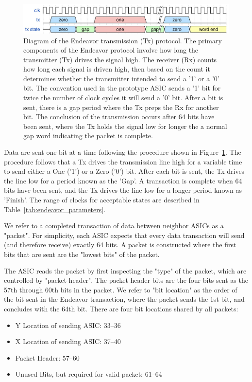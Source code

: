 \begin{figure}[]
\centering
\includegraphics[width=\textwidth]{images/endeavor_protocol.jpg}
\caption{Diagram of the Endeavor transmission (Tx) protocol.
The primary components of the Endeavor protocol involve how long the transmitter (Tx) drives the signal high.
The receiver (Rx) counts how long each signal is driven high, then based on the count it determines whether the transmitter intended to send a '1' or a '0' bit.
The convention used in the prototype ASIC sends a '1' bit for twice the number of clock cycles it will send a '0' bit.
After a bit is sent, there is a gap period where the Tx preps the Rx for another bit.
The conclusion of the transmission occurs after 64 bits have been sent, where the Tx holds the signal low for longer the a normal gap word indicating the packet is complete.
}
\label{fig:endeavor}
\end{figure}

Data are sent one bit at a time following the procedure shown in Figure~\ref{fig:endeavor}. 
The procedure follows that a Tx drives the transmission line high for a variable time to send either a One ('1') or a Zero ('0') bit.
After each bit is sent, the Tx drives the line low for a period known as the 'Gap'.
A transaction is complete when 64 bits have been sent, and the Tx drives the line low for a longer period known as 'Finish'.
The range of clocks for acceptable states are described in Table~\ref{tab:endeavor_parameters}.

We refer to a completed transaction of data between neighbor ASICs as a "packet".
For simplicity, each ASIC expects that every data transaction will send (and therefore receive) exactly 64 bits.
A packet is constructed where the first bits that are sent are the "lowest bits" of the packet.

The ASIC reads the packet by first inspecting the "type" of the packet, which are controlled by "packet header".
The packet header bits are the four bits sent as the 57th through 60th bits in the packet.
We refer to "bit location" as the order of the bit sent in the Endeavor transaction, where the packet sends the 1st bit, and concludes with the 64th bit.
There are four bit locations shared by all packets:

\begin{itemize}
    \item Y Location of sending ASIC: 33--36
    \item X Location of sending ASIC: 37--40
    \item Packet Header: 57--60
    \item Unused Bits, but required for valid packet: 61--64
\label{bit_reservation}
\end{itemize}

